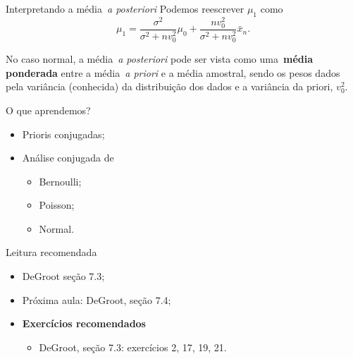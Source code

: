 \begin{frame}{Interpretando a média~\textit{a posteriori}}
 Podemos reescrever $\mu_1$ como
 \begin{equation}
 \label{eq:posterior_mean_normal}
  \mu_1 = \frac{\sigma^2}{\sigma^2 + nv_0^2}\mu_0 + \frac{nv_0^2}{\sigma^2 + nv_0^2}\bar{x}_n.
 \end{equation}
\begin{obs}
 No caso normal, a média~\textit{a posteriori} pode ser vista como uma~\textbf{média ponderada} entre a média~\textit{a priori} e a média amostral, sendo os pesos dados pela variância (conhecida) da distribuição dos dados e a variância da priori, $v_0^2$.
\end{obs}
\end{frame}

\begin{frame}{O que aprendemos?}
 \begin{itemize}
  \item[\faLightbulbO] Prioris conjugadas;
  \item[\faLightbulbO] Análise conjugada de
  \begin{itemize}
   \item Bernoulli;
   \item Poisson;
   \item Normal.
  \end{itemize}
 \end{itemize}
\end{frame}

\begin{frame}{Leitura recomendada}
\begin{itemize}
 \item[\faBook] DeGroot seção 7.3;
 \item[\faForward] Próxima aula: DeGroot, seção 7.4;
 \item {\large\textbf{Exercícios recomendados}}
 \begin{itemize}
  \item[\faBookmark] DeGroot, seção 7.3: exercícios 2, 17, 19, 21. 
  \end{itemize}
 \end{itemize} 
\end{frame}
